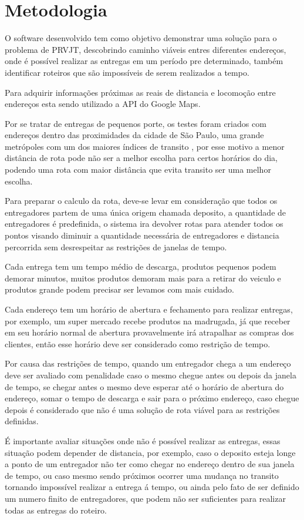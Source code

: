 \chapter{Metodologia}
O software desenvolvido tem como objetivo demonstrar uma solução para o problema de PRVJT, descobrindo caminho viáveis entres diferentes endereços, onde é possível realizar as entregas em um período pre determinado, também identificar roteiros que são impossíveis de serem realizados a tempo. 

Para adquirir informações próximas as reais de distancia e locomoção entre endereços esta sendo utilizado a API do Google Maps\cite{GoogleMatrix}.

Por se tratar de entregas de pequenos porte, os testes foram criados com endereços dentro das proximidades da cidade de São Paulo, uma grande metrópoles com um dos maiores índices de transito \cite{TomTom}, por esse motivo a menor distância de rota pode não ser a melhor escolha para certos horários do dia, podendo uma rota com maior distância que evita transito ser uma melhor escolha.

Para preparar o calculo da rota, deve-se levar em consideração que todos os entregadores partem de uma única origem chamada deposito, a quantidade de entregadores é predefinida, o sistema ira devolver rotas para atender todos os pontos visando diminuir a quantidade necessária de entregadores e distancia percorrida sem desrespeitar as restrições de janelas de tempo.

Cada entrega tem um tempo médio de descarga, produtos pequenos podem demorar minutos, muitos produtos demoram mais para a retirar do veiculo e produtos grande podem precisar ser levamos com mais cuidado.

Cada endereço tem um horário de abertura e fechamento para realizar entregas, por exemplo, um super mercado recebe produtos na madrugada, já que receber em seu horário normal de abertura provavelmente irá atrapalhar as compras dos clientes, então esse horário deve ser considerado como restrição de tempo.

Por causa das restrições de tempo, quando um entregador chega a um endereço deve ser avaliado com penalidade caso o mesmo chegue antes ou depois da janela de tempo, se chegar antes o mesmo deve esperar até o horário de abertura do endereço, somar o tempo de descarga e sair para o próximo endereço,  caso chegue depois é considerado que não é uma solução de rota viável para as restrições definidas. 

É importante avaliar situações onde não é possível realizar as entregas, essas situação podem depender de distancia, por exemplo, caso o deposito esteja longe a ponto de um entregador não ter como chegar no endereço dentro de sua janela de tempo, ou caso mesmo sendo próximos ocorrer uma mudança no transito tornando impossível realizar a entrega á tempo, ou ainda pelo fato de ser definido um numero finito de entregadores, que podem não ser suficientes para realizar todas as entregas do roteiro.

